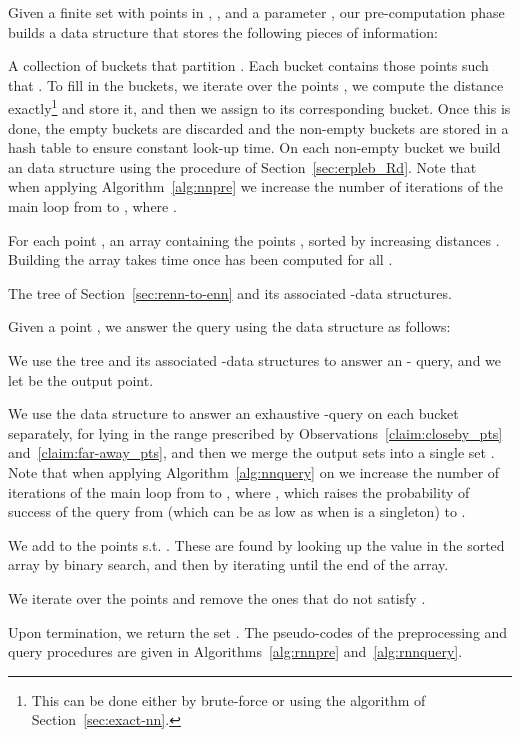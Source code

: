Given a finite set  with  points in , , and a parameter , our pre-computation phase builds a
data structure  that stores the following pieces of
information:
\begin{slist}
\item[i.] A collection of buckets  that
  partition . Each bucket  contains those points  such
  that . To fill in the
  buckets, we iterate over the points , we compute the
  distance  exactly\footnote{This can be done either by
    brute-force or using the algorithm of
    Section~\ref{sec:exact-nn}.} and store it, and then we assign 
  to its corresponding bucket.
Once this is done, the empty buckets are discarded and the non-empty
 buckets are stored in a hash table to ensure constant look-up
 time. On each non-empty bucket  we build an  data structure using the procedure of
 Section~\ref{sec:erpleb_Rd}.
Note that when applying Algorithm~\ref{alg:nnpre} we increase the
 number of iterations of the main loop from 
 to , where .
\item[ii.] For each point , an array  containing the
  points , sorted by increasing
  distances . Building the array takes  time once
   has been computed for all .
\item[iii.] The tree  of
  Section~\ref{sec:renn-to-enn} and its associated -\pleb data
  structures.
\end{slist}

\smallskip

\noindent Given a point , we answer the \rnn
query using the  data structure as follows:
\begin{slist}
\item[1.] We use the tree  and its
  associated -\pleb data structures to answer an -\nn
  query, and we let  be the output point.
\item[2.] We use the  data structure to
  answer an exhaustive -\pleb query on each bucket 
  separately, for  lying in the range prescribed by
  Observations~\ref{claim:closeby_pts} and~\ref{claim:far-away_pts},
and then we merge the output sets into a single set .
Note that when applying Algorithm~\ref{alg:nnquery} on  we
 increase the number of iterations of the main loop from
  to , where
 , which raises the probability of success
 of the query from  (which can be as low as
  when   is a singleton) to .
\item[3.] We add to  the points  s.t.
  . These are found by looking up
  the value  in the sorted array  by
  binary search, and then by iterating until the end of the array.
\item[4.] We iterate over the points  and remove the ones
  that do not satisfy .
\end{slist}
\smallskip
Upon termination, we return the set .  The pseudo-codes of the
preprocessing and query procedures are given in Algorithms~\ref{alg:rnnpre}
and~\ref{alg:rnnquery}.

